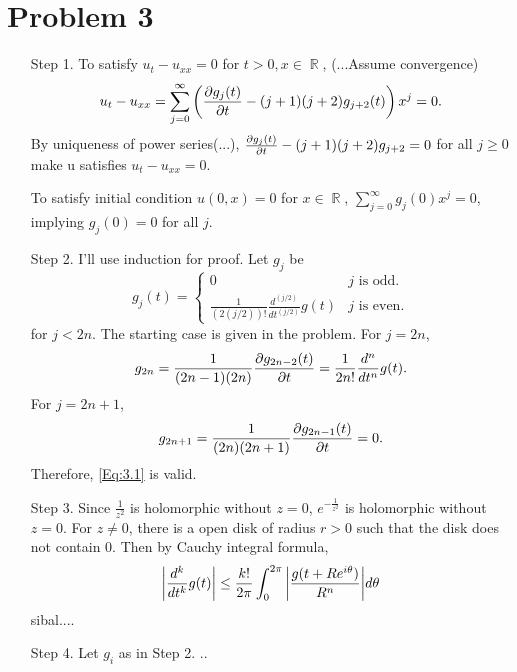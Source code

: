 \documentclass{article}
\DeclareMathOperator{\rr}{\mathbb{R}}
\begin{document}
\section*{Problem 3}
\begin{enumerate}
\item[Step 1.] To satisfy $u_t-u_{xx}=0$ for $t>0, x\in \rr$, (...Assume convergence) 
\begin{equation*}
u_t-u_{xx}=\sum_{j=0}^\infty \left(\pdv{g_j(t)}{t}-(j+1)(j+2)g_{j+2}(t)\right)x^{j}=0.
\end{equation*}
By uniqueness of power series(...), $\pdv{g_j(t)}{t}-(j+1)(j+2)g_{j+2}=0$ for all $j\geq 0$ make u satisfies $u_t-u_{xx}=0$.

To satisfy initial condition $u(0, x)=0$ for $x\in \rr$, $\sum_{j=0}^\infty g_j(0)x^j=0$, implying $g_j(0)=0$ for all $j$.

\item[Step 2.] I'll use induction for proof. Let $g_j$ be
\begin{equation}\label{Eq:3.1}
g_j(t)=\begin{cases}
0 & j\text{ is odd.} \\
\frac{1}{(2(j/2))!}\frac{d^{(j/2)}}{dt^{(j/2)}}g(t) & j\text{ is even.}
\end{cases}
\end{equation}
for $j<2n$. The starting case is given in the problem. For $j=2n$,
\begin{equation*}
g_{2n}=\frac{1}{(2n-1)(2n)}\pdv{g_{2n-2}(t)}{t}=\frac{1}{2n!}\frac{d^{n}}{dt^{n}}g(t).
\end{equation*}
For $j=2n+1$,
\begin{equation*}
g_{2n+1}=\frac{1}{(2n)(2n+1)}\pdv{g_{2n-1}(t)}{t}=0.
\end{equation*}
Therefore, \eqref{Eq:3.1} is valid.
\item[Step 3.] Since $\frac{1}{z^2}$ is holomorphic without $z= 0$, $e^{-\frac{1}{z^2}}$ is holomorphic without $z=0$.
For $z\neq 0$, there is a open disk of radius $r>0$ such that the disk does not contain $0$. Then by Cauchy integral formula,
\begin{equation*}
\abs{\frac{d^k}{dt^k}g(t)}\leq \frac{k!}{2\pi}\int_0^{2\pi} \abs{\frac{g(t+Re^{i\theta})}{R^{n}}}d\theta
\end{equation*}
sibal....

\item[Step 4.] Let $g_i$ as in Step 2. ..
\end{enumerate}
\end{document}
